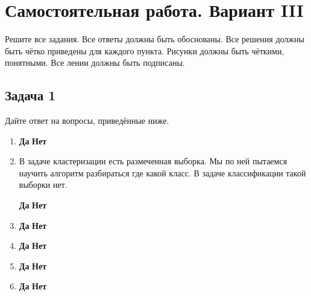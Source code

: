 \documentclass[12pt, a4paper, oneside]{article}
\begin{document}
\newpage 


\section*{Самостоятельная работа. Вариант III}

Решите все задания. Все ответы должны быть обоснованы. Все решения должны быть чётко приведены для каждого пункта. Рисунки должны быть чёткими, понятными. Все лении должны быть подписаны. 

\subsection*{Задача 1 }

Дайте ответ на вопросы, приведённые ниже.

\begin{enumerate}
	\item  
	
	\hspace{2cm} \textbf{Да}  \hspace{4cm} \textbf{Нет} 
	
	\item В задаче кластеризации есть размеченная выборка. Мы по ней пытаемся научить алгоритм разбираться где какой класс. В задаче классификации такой выборки нет. 
	
	\hspace{2cm} \textbf{Да}  \hspace{4cm} \textbf{Нет} 
	
	\item 
	
	\hspace{2cm} \textbf{Да}  \hspace{4cm} \textbf{Нет} 
	
	\item 	
	
	\hspace{2cm} \textbf{Да}  \hspace{4cm} \textbf{Нет} 
	
	\item 
	
	\hspace{2cm} \textbf{Да}  \hspace{4cm} \textbf{Нет} 
	
	\item 
	
	\hspace{2cm} \textbf{Да}  \hspace{4cm} \textbf{Нет} 
	

\end{enumerate}
\end{document}
